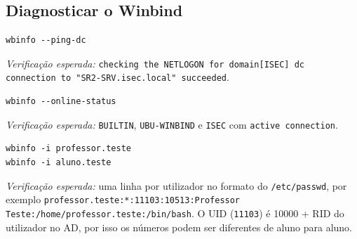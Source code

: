 
\subsection[Diagnosticar o Winbind]{Diagnosticar o Winbind}



\begin{lstlisting}[style=bashstyle]
wbinfo --ping-dc
\end{lstlisting}

\emph{Verificação esperada:} \texttt{checking the NETLOGON for domain[ISEC] dc connection to "SR2-SRV.isec.local" succeeded}.


\begin{lstlisting}[style=bashstyle]
wbinfo --online-status
\end{lstlisting}

\emph{Verificação esperada:} \texttt{BUILTIN}, \texttt{UBU-WINBIND} e \texttt{ISEC} com \texttt{active connection}.


\begin{lstlisting}[style=bashstyle]
wbinfo -i professor.teste
wbinfo -i aluno.teste
\end{lstlisting}

\emph{Verificação esperada:} uma linha por utilizador no formato do \texttt{/\allowbreak{}etc/\allowbreak{}passwd}, por exemplo \texttt{professor.teste:*:11103:10513:Professor Teste:/\allowbreak{}home/\allowbreak{}professor.teste:/\allowbreak{}bin/\allowbreak{}bash}. O UID (\texttt{11103}) é 10000 + RID do utilizador no AD, por isso os números podem ser diferentes de aluno para aluno.

